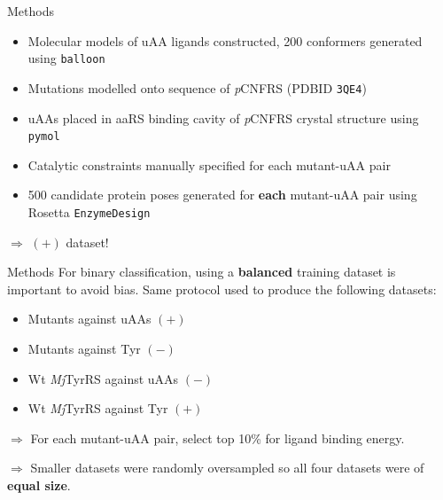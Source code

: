 \documentclass{beamer}
\begin{document}
\begin{frame}{Methods}
    \begin{itemize}
        \item Molecular models of uAA ligands constructed, 200 conformers generated using \texttt{balloon}
        \item Mutations modelled onto sequence of \textit{p}CNFRS (PDBID \texttt{3QE4})
        \item uAAs placed in aaRS binding cavity of \textit{p}CNFRS crystal structure using \texttt{pymol}
        \item Catalytic constraints manually specified for each mutant-uAA pair
        \item 500 candidate protein poses generated for \textbf{each} mutant-uAA pair using Rosetta \texttt{EnzymeDesign}
    \end{itemize}
    \begin{center}$\Rightarrow$ $(+)$ dataset!\end{center}
\end{frame}

\begin{frame}{Methods}
    For binary classification, using a \textbf{balanced} training dataset is important to avoid bias. Same protocol used to produce the following datasets:
    \begin{itemize}
        \item Mutants against uAAs $(+)$
        \item Mutants against Tyr $(-)$
    \end{itemize}
    \begin{itemize}
        \item Wt \textit{Mj}TyrRS against uAAs $(-)$
        \item Wt \textit{Mj}TyrRS against Tyr $(+)$
    \end{itemize}
    
    $\Rightarrow$ For each mutant-uAA pair, select top 10\% for ligand binding energy.
    
    $\Rightarrow$ Smaller datasets were randomly oversampled so all four datasets were of \textbf{equal size}.

\end{frame}
\end{document}
